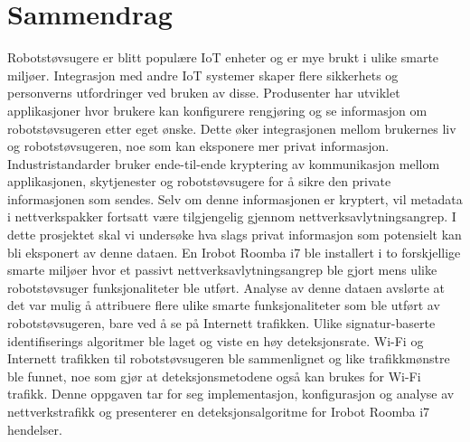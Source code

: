 \chapter*{Sammendrag}
Robotstøvsugere er blitt populære IoT enheter og er mye brukt i ulike smarte miljøer. Integrasjon med andre IoT systemer skaper flere sikkerhets og personverns utfordringer ved bruken av disse. Produsenter har utviklet applikasjoner hvor brukere kan konfigurere rengjøring og se informasjon om robotstøvsugeren etter eget ønske. Dette øker integrasjonen mellom brukernes liv og robotstøvsugeren, noe som kan eksponere mer privat informasjon. Industristandarder bruker ende-til-ende kryptering av kommunikasjon mellom applikasjonen, skytjenester og robotstøvsugere for å sikre den private informasjonen som sendes. Selv om denne informasjonen er kryptert, vil metadata i nettverkspakker fortsatt være tilgjengelig gjennom nettverksavlytningsangrep. I dette prosjektet skal vi undersøke hva slags privat informasjon som potensielt kan bli eksponert av denne dataen. En Irobot Roomba i7 ble installert i to forskjellige smarte miljøer hvor et passivt nettverksavlytningsangrep ble gjort mens ulike robotstøvsuger funksjonaliteter ble utført. Analyse av denne dataen avslørte at det var mulig å attribuere flere ulike smarte funksjonaliteter som ble utført av robotstøvsugeren, bare ved å se på Internett trafikken. Ulike signatur-baserte identifiserings algoritmer ble laget og viste en høy deteksjonsrate. Wi-Fi og Internett trafikken til robotstøvsugeren ble sammenlignet og like trafikkmønstre ble funnet, noe som gjør at deteksjonsmetodene også kan brukes for Wi-Fi trafikk. Denne oppgaven tar for seg implementasjon, konfigurasjon og analyse av nettverkstrafikk og presenterer en deteksjonsalgoritme for Irobot Roomba i7 hendelser.